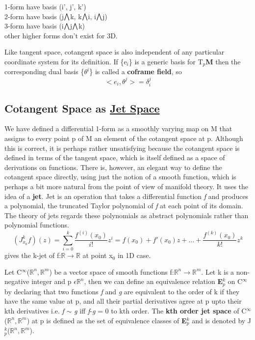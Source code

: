 1-form have basis (i', j', k') \\
2-form have basis (j$\exterior$k, k$\exterior$i, i$\exterior$j) \\
3-form have basis (i$\exterior$j$\exterior$k) \\
other higher forms don't exist for 3D.

Like tangent space, cotangent space is also independent of any particular coordinate system for its definition. 
If \{e$_i$\} is a generic basis for T$_p$\textbf{M} then the corresponding dual basis \{$\theta^i$\} is called a \textbf{coframe field}, so
\begin{equation}
    \Big<e_i, \theta^j\Big> = \delta_i^j
\end{equation}

\subsection{Cotangent Space as \href{https://en.wikipedia.org/wiki/Jet_(mathematics)}{Jet Space} }
We have defined a differential 1-form as a smoothly varying map
on M that assigns to every point p of M an element of the cotangent space at p.
Although this is correct, it is perhaps rather unsatisfying because the cotangent
space is defined in terms of the tangent space, which is itself defined as a space of
derivations on functions. There is, however, an elegant way to define the cotangent
space directly, using just the notion of a smooth function, which is perhaps a bit
more natural from the point of view of manifold theory. It uses the idea of a \textbf{jet}.
Jet is an operation that takes a differential function \textit{f} and produces a polynomial,
the truncated Taylor polynomial of \textit{f} at each point of its domain. 
The theory of jets regards these polynomials as abstract polynomials rather than polynomial functions.
\begin{equation}
    (J_{x_0}^k f)(z) = \sum_{i=0}^{k} \frac{f^{(i)}(x_0)}{i!}z^i = f(x_0) + f'(x_0)z + ... + \frac{f^{(k)}(x_0)}{k!}z^k
\end{equation}
gives the k-jet of f:$\mathbb{R} \rightarrow \mathbb{R}$ at point x$_0$ in 1D case.

Let C$^\infty$($\mathbb{R}^n, \mathbb{R}^m$) be a vector space of smooth functions f:$\mathbb{R}^n \rightarrow \mathbb{R}^m$.
Let k is a non-negative integer and p $\epsilon \mathbb{R}^n$, then we can define an equivalence relation \textbf{E}$^k_p$ on C$^\infty$
by declaring that two functions \textit{f} and \textit{g} are equivalent to the order of k if they have the same value at p,
and all their partial derivatives agree at p upto their kth derivatives i.e.
\textit{f} $\sim$ \textit{g} iff \textit{f}-\textit{g} = 0 to kth order.
The \textbf{kth order jet space} of C$^\infty$($\mathbb{R}^n, \mathbb{R}^m$) at p is defined as the set of 
equivalence classes of \textbf{E}$^k_p$ and is denoted by J$^k_p$($\mathbb{R}^n, \mathbb{R}^m$).

